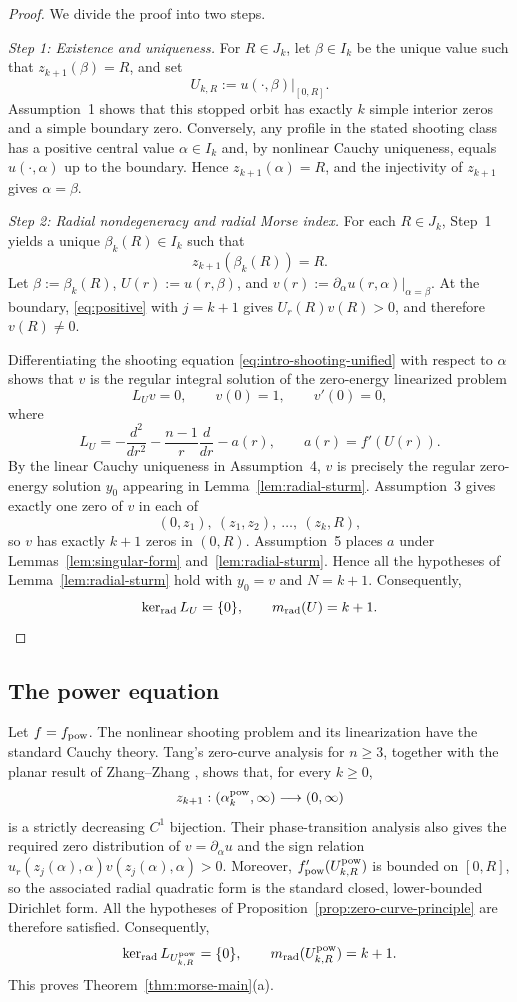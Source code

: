 \documentclass[11pt]{article}
\begin{document}
\begin{proof}
{
We divide the proof into two steps.

\medskip
\noindent\emph{Step 1: Existence and uniqueness.}
For $R\in J_k$, let $\beta\in I_k$ be the unique value such that
$z_{k+1}(\beta)=R$, and set
\[
 U_{k,R}:=u(\cdot,\beta)|_{[0,R]}.
\]
Assumption~1 shows that this stopped orbit has exactly $k$ simple
interior zeros and a simple boundary zero. Conversely, any profile in
the stated shooting class has a positive central value $\alpha\in I_k$
and, by nonlinear Cauchy uniqueness, equals $u(\cdot,\alpha)$ up to the
boundary. Hence $z_{k+1}(\alpha)=R$, and the injectivity of $z_{k+1}$
gives $\alpha=\beta$.

\medskip
\noindent\emph{Step 2: Radial nondegeneracy and radial Morse index.}
For each $R\in J_k$, Step~1 yields a unique $\beta_k(R)\in I_k$ such
that
\[
 z_{k+1}(\beta_k(R))=R.
\]
Let $\beta:=\beta_k(R)$, $U(r):=u(r,\beta)$, and $v(r):=\left.\partial_\alpha u(r,\alpha)\right|_{\alpha=\beta}$.
At the boundary, \eqref{eq:positive} with $j=k+1$ gives $U_r(R)v(R)>0$,
and therefore $v(R)\ne0$.

Differentiating the shooting equation
\eqref{eq:intro-shooting-unified} with respect to $\alpha$ shows that
$v$ is the regular integral solution of the zero-energy linearized
problem
\[
 L_Uv=0,
 \qquad v(0)=1,
 \qquad v'(0)=0,
\]
where
\[
 L_U=-\frac{d^2}{dr^2}-\frac{n-1}{r}\frac{d}{dr}-a(r),
 \qquad a(r)=f'(U(r)).
\]
By the linear Cauchy uniqueness in Assumption~4, $v$ is precisely the
regular zero-energy solution $y_0$ appearing in
Lemma~\ref{lem:radial-sturm}. Assumption~3 gives exactly one zero of
$v$ in each of
\[
 (0,z_1),\ (z_1,z_2),\ \ldots,\ (z_k,R),
\]
so $v$ has exactly $k+1$ zeros in $(0,R)$. {Assumption~5 places $a$ under Lemmas~\ref{lem:singular-form}
and~\ref{lem:radial-sturm}.} Hence all the hypotheses of
Lemma~\ref{lem:radial-sturm} hold with $y_0=v$ and $N=k+1$. Consequently,
\[
 \ker_{\rm rad}L_U=\{0\},
 \qquad
 m_{\rm rad}(U)=k+1.
\]
}
\end{proof}

\subsection{The power equation}
Let $f=f_{\rm pow}$. The nonlinear shooting problem and its
linearization have the standard Cauchy theory. {Tang's zero-curve analysis} \cite{Tang}
for $n\geq3$, together with the planar result of
Zhang--Zhang \cite{ZhangZhang}, shows that, for every {$k\geq0$},
\[
 z_{k+1}:(\alpha_k^{\rm pow},\infty)\longrightarrow(0,\infty)
\]
is a strictly decreasing $C^1$ bijection. Their phase-transition
analysis also gives the required zero distribution of $v=\partial_\alpha u$ and the sign relation
$u_r(z_j(\alpha),\alpha)
v(z_j(\alpha),\alpha)>0$.  Moreover, $f_{\rm pow}'(U^{\rm pow}_{k,R})$ is bounded on $[0,R]$,
so the associated radial quadratic form is the standard closed,
lower-bounded Dirichlet form. All the hypotheses of
Proposition~\ref{prop:zero-curve-principle} are therefore satisfied.
Consequently,
\[
 \ker_{\rm rad}L_{U^{\rm pow}_{k,R}}=\{0\},
 \qquad
 m_{\rm rad}(U^{\rm pow}_{k,R})=k+1.
\]
This proves Theorem~\ref{thm:morse-main}(a).
\end{document}
